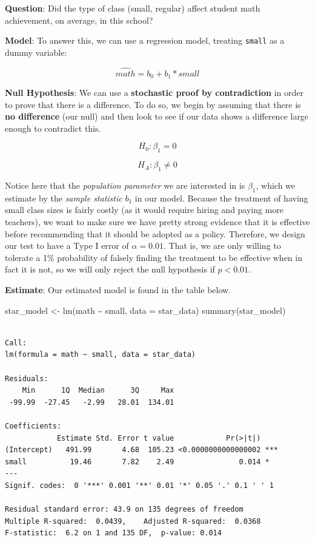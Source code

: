 \documentclass[
  letterpaper,
  DIV=11,
  numbers=noendperiod]{scrreprt}
\newenvironment{Shaded}{\begin{snugshade}}{\end{snugshade}}
\newcommand{\AttributeTok}[1]{\textcolor[rgb]{0.40,0.45,0.13}{#1}}
\newcommand{\FunctionTok}[1]{\textcolor[rgb]{0.28,0.35,0.67}{#1}}
\newcommand{\NormalTok}[1]{\textcolor[rgb]{0.00,0.23,0.31}{#1}}
\newcommand{\OtherTok}[1]{\textcolor[rgb]{0.00,0.23,0.31}{#1}}
\newcommand{\SpecialCharTok}[1]{\textcolor[rgb]{0.37,0.37,0.37}{#1}}
\theoremstyle{definition}
\theoremstyle{remark}
\begin{document}
\textbf{Question}: Did the type of class (small, regular) affect student
math achievement, on average, in this school?

\textbf{Model}: To answer this, we can use a regression model, treating
\texttt{small} as a dummy variable:

\[\widehat{math} = b_0 + b_1*small\]

\textbf{Null Hypothesis}: We can use a \textbf{stochastic proof by
contradiction} in order to prove that there is a difference. To do so,
we begin by assuming that there is \textbf{no difference} (our null) and
then look to see if our data shows a difference large enough to
contradict this.

\[H_0: \beta_1 = 0\]

\[H_A: \beta_1 \neq 0\]

Notice here that the \emph{population parameter} we are interested in is
\(\beta_1\), which we estimate by the \emph{sample statistic} \(b_1\) in
our model. Because the treatment of having small class sizes is fairly
costly (as it would require hiring and paying more teachers), we want to
make sure we have pretty strong evidence that it is effective before
recommending that it should be adopted as a policy. Therefore, we design
our test to have a Type I error of \(\alpha = 0.01\). That is, we are
only willing to tolerate a 1\% probability of falsely finding the
treatment to be effective when in fact it is not, so we will only reject
the null hypothesis if \(p < 0.01.\)

\textbf{Estimate}: Our estimated model is found in the table below.

\begin{Shaded}
\begin{Highlighting}[]
\NormalTok{star\_model }\OtherTok{\textless{}{-}} \FunctionTok{lm}\NormalTok{(math }\SpecialCharTok{\textasciitilde{}}\NormalTok{ small, }\AttributeTok{data =}\NormalTok{ star\_data)}
\FunctionTok{summary}\NormalTok{(star\_model)}
\end{Highlighting}
\end{Shaded}

\begin{verbatim}

Call:
lm(formula = math ~ small, data = star_data)

Residuals:
    Min      1Q  Median      3Q     Max 
 -99.99  -27.45   -2.99   28.01  134.01 

Coefficients:
            Estimate Std. Error t value            Pr(>|t|)    
(Intercept)   491.99       4.68  105.23 <0.0000000000000002 ***
small          19.46       7.82    2.49               0.014 *  
---
Signif. codes:  0 '***' 0.001 '**' 0.01 '*' 0.05 '.' 0.1 ' ' 1

Residual standard error: 43.9 on 135 degrees of freedom
Multiple R-squared:  0.0439,    Adjusted R-squared:  0.0368 
F-statistic:  6.2 on 1 and 135 DF,  p-value: 0.014
\end{verbatim}
\end{document}
